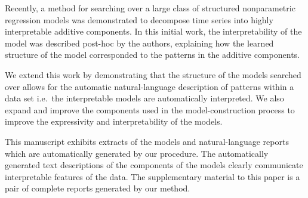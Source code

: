 \documentclass{article}
\def\ie{i.e.\ }
\begin{document}
Recently, a method for searching over a large class of structured nonparametric regression models \citep{DuvLloGroetal13} was demonstrated to decompose time series into highly interpretable additive components.
In this initial work, the interpretability of the model was described post-hoc by the authors, explaining how the learned structure of the model corresponded to the patterns in the additive components.


We extend this work by demonstrating that the structure of the models searched over allows for the automatic natural-language description of patterns within a data set \ie the interpretable models are automatically interpreted.
We also expand and improve the components used in the model-construction process to improve the expressivity and interpretability of the models.

This manuscript exhibits extracts of the models and natural-language reports which are automatically generated by our procedure.
The automatically generated text descriptions of the components of the models clearly communicate interpretable features of the data.
The supplementary material to this paper is a pair of complete reports generated by our method.
\end{document}
